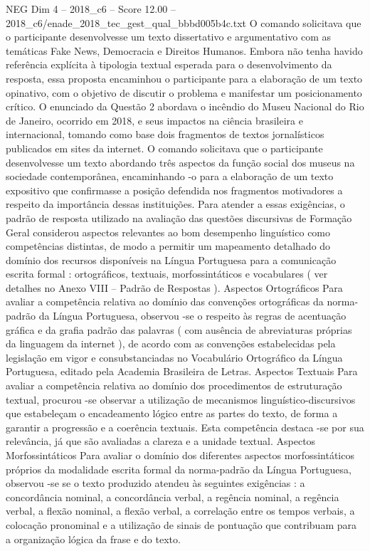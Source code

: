 \begin{textsample}{NEG Dim 4 – 2018\_c6 – Score 12.00 – 2018\_c6/enade\_2018\_tec\_gest\_qual\_bbbd005b4c.txt}
O comando solicitava que o participante desenvolvesse um texto dissertativo e argumentativo com as temáticas Fake News, Democracia e Direitos Humanos.
Embora não tenha havido referência explícita à tipologia textual esperada para o desenvolvimento da resposta, essa proposta encaminhou o participante para a elaboração de um texto opinativo, com o objetivo de discutir o problema e manifestar um posicionamento crítico.
O enunciado da Questão 2 abordava o incêndio do Museu Nacional do Rio de Janeiro, ocorrido em 2018, e seus impactos na ciência brasileira e internacional, tomando como base dois fragmentos de textos jornalísticos publicados em sites da internet.
O comando solicitava que o participante desenvolvesse um texto abordando três aspectos da função social dos museus na sociedade contemporânea, encaminhando -o para a elaboração de um texto expositivo que confirmasse a posição defendida nos fragmentos motivadores a respeito da importância dessas instituições.
Para atender a essas exigências, o padrão de resposta utilizado na avaliação das questões discursivas de Formação Geral considerou aspectos relevantes ao bom desempenho linguístico como competências distintas, de modo a permitir um mapeamento detalhado do domínio dos recursos disponíveis na Língua Portuguesa para a comunicação escrita formal : ortográficos, textuais, morfossintáticos e vocabulares ( ver detalhes no Anexo VIII – Padrão de Respostas ).
Aspectos Ortográficos Para avaliar a competência relativa ao domínio das convenções ortográficas da norma-padrão da Língua Portuguesa, observou -se o respeito às regras de acentuação gráfica e da grafia padrão das palavras ( com ausência de abreviaturas próprias da linguagem da internet ), de acordo com as convenções estabelecidas pela legislação em vigor e consubstanciadas no Vocabulário Ortográfico da Língua Portuguesa, editado pela Academia Brasileira de Letras.
Aspectos Textuais Para avaliar a competência relativa ao domínio dos procedimentos de estruturação textual, procurou -se observar a utilização de mecanismos linguístico-discursivos que estabeleçam o encadeamento lógico entre as partes do texto, de forma a garantir a progressão e a coerência textuais.
Esta competência destaca -se por sua relevância, já que são avaliadas a clareza e a unidade textual.
Aspectos Morfossintáticos Para avaliar o domínio dos diferentes aspectos morfossintáticos próprios da modalidade escrita formal da norma-padrão da Língua Portuguesa, observou -se se o texto produzido atendeu às seguintes exigências : a concordância nominal, a concordância verbal, a regência nominal, a regência verbal, a flexão nominal, a flexão verbal, a correlação entre os tempos verbais, a colocação pronominal e a utilização de sinais de pontuação que contribuam para a organização lógica da frase e do texto.

\end{textsample}
